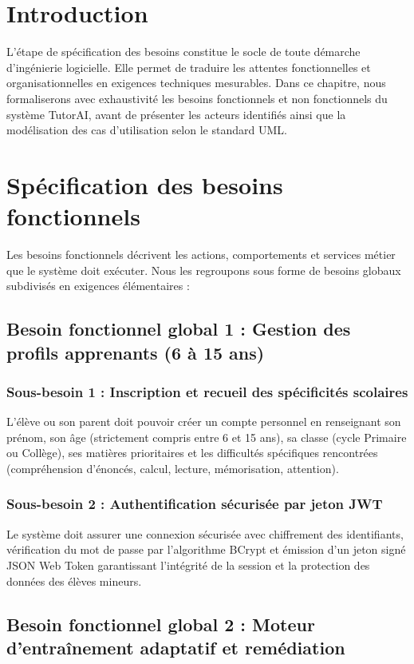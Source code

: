 \documentclass[12pt,a4paper]{report}
\begin{document}
\section{Introduction}
L'étape de spécification des besoins constitue le socle de toute démarche d'ingénierie logicielle. Elle permet de traduire les attentes fonctionnelles et organisationnelles en exigences techniques mesurables. Dans ce chapitre, nous formaliserons avec exhaustivité les besoins fonctionnels et non fonctionnels du système TutorAI, avant de présenter les acteurs identifiés ainsi que la modélisation des cas d'utilisation selon le standard UML.

\section{Spécification des besoins fonctionnels}
Les besoins fonctionnels décrivent les actions, comportements et services métier que le système doit exécuter. Nous les regroupons sous forme de besoins globaux subdivisés en exigences élémentaires :

\subsection{Besoin fonctionnel global 1 : Gestion des profils apprenants (6 à 15 ans)}
\subsubsection{Sous-besoin 1 : Inscription et recueil des spécificités scolaires}
L'élève ou son parent doit pouvoir créer un compte personnel en renseignant son prénom, son âge (strictement compris entre 6 et 15 ans), sa classe (cycle Primaire ou Collège), ses matières prioritaires et les difficultés spécifiques rencontrées (compréhension d'énoncés, calcul, lecture, mémorisation, attention).

\subsubsection{Sous-besoin 2 : Authentification sécurisée par jeton JWT}
Le système doit assurer une connexion sécurisée avec chiffrement des identifiants, vérification du mot de passe par l'algorithme BCrypt et émission d'un jeton signé JSON Web Token garantissant l'intégrité de la session et la protection des données des élèves mineurs.

\subsection{Besoin fonctionnel global 2 : Moteur d'entraînement adaptatif et remédiation}
\end{document}
